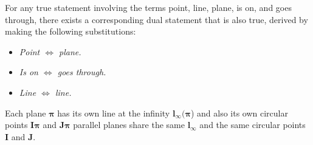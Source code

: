 \begin{theorem}
    For any true statement involving the terms point, line, plane, is on, and goes through, there exists a corresponding dual statement that is also true, derived by making the following substitutions:
\end{theorem}
\begin{itemize}
    \item \textit{Point $\Leftrightarrow$ plane.}
    \item \textit{Is on $\Leftrightarrow$ goes through.}
    \item \textit{Line $\Leftrightarrow$ line.}
\end{itemize}

Each plane $\boldsymbol{\pi}$ has its own line at the infinity $\mathbf{l}_{\infty}(\boldsymbol{\pi}$) and also its own circular points $\mathbf{I}\boldsymbol{\pi}$ and $\mathbf{J}\boldsymbol{\pi}$ parallel planes share the same $\mathbf{l}_{\infty}$ and the same circular points $\mathbf{I}$ and $\mathbf{J}$. 